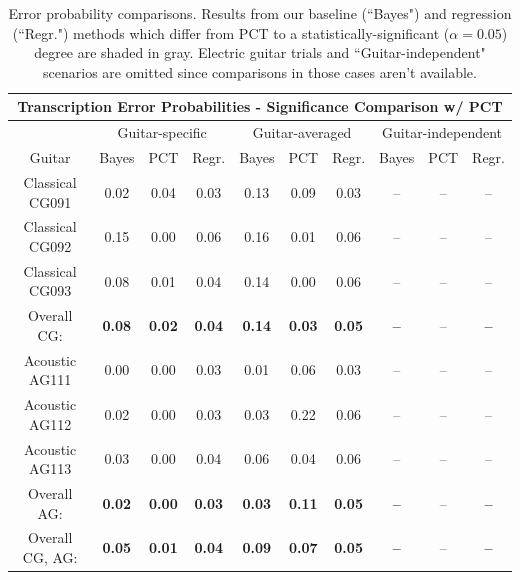 \documentclass[12pt]{cmuthesis}
\begin{document}
\begin{table}[!htbp]
\begin{center}
\begin{tabular} {||c||c|c|c||c|c|c||c|c|c||}
\hline
\multicolumn{10}{||c||}{\bf{Transcription Error Probabilities - Significance Comparison w/ PCT}} \\
\hline
 & \multicolumn{3}{|c||}{Guitar-specific} & \multicolumn{3}{|c||}{Guitar-averaged}& \multicolumn{3}{|c||}{Guitar-independent}\\
\hline
Guitar & Bayes & PCT & Regr. & Bayes & PCT & Regr. & Bayes & PCT & Regr.\\
\hline
\hline
Classical CG091 &  \cellcolor[gray]{0.8}0.02 & 0.04 & 0.03 &  \cellcolor[gray]{0.8}0.13 & 0.09 &  \cellcolor[gray]{0.8}0.03 & -- & -- & -- \\
\hline
Classical CG092 &  \cellcolor[gray]{0.8}0.15 & 0.00 &  \cellcolor[gray]{0.8}0.06 &  \cellcolor[gray]{0.8}0.16 & 0.01 &  \cellcolor[gray]{0.8}0.06 & -- & -- & -- \\
\hline
Classical CG093 &  \cellcolor[gray]{0.8}0.08 & 0.01 &  \cellcolor[gray]{0.8}0.04 & \cellcolor[gray]{0.8}0.14 & 0.00 &  \cellcolor[gray]{0.8}0.06 & -- & -- & -- \\
\hline
Overall CG: &  \cellcolor[gray]{0.8}\bf{0.08} & \bf{0.02}  &  \cellcolor[gray]{0.8}\bf{0.04} &  \cellcolor[gray]{0.8}\bf{0.14} & \bf{0.03} &  \cellcolor[gray]{0.8}\bf{0.05} & \bf{--} & -- & \bf{--}\\
\hline
\hline
Acoustic AG111 & 0.00 & 0.00 &  \cellcolor[gray]{0.8}0.03 &  \cellcolor[gray]{0.8}0.01 & 0.06 &  \cellcolor[gray]{0.8}0.03 & -- & -- & -- \\
\hline
Acoustic AG112 &  \cellcolor[gray]{0.8}0.02 & 0.00 &  \cellcolor[gray]{0.8}0.03 &  \cellcolor[gray]{0.8}0.03 & 0.22 &  \cellcolor[gray]{0.8}0.06 & -- & -- & -- \\
\hline
Acoustic AG113  &  \cellcolor[gray]{0.8}0.03 & 0.00 &  \cellcolor[gray]{0.8}0.04 &  \cellcolor[gray]{0.8}0.06 & 0.04 &  \cellcolor[gray]{0.8}0.06 & -- & -- & --\\
\hline
Overall AG: &  \cellcolor[gray]{0.8}\bf{0.02} & \bf{0.00} &  \cellcolor[gray]{0.8}\bf{0.03} &  \cellcolor[gray]{0.8}\bf{0.03} & \bf{0.11} &  \cellcolor[gray]{0.8}\bf{0.05} & \bf{--} & -- & \bf{--}\\
\hline
\hline
\hline
Overall CG, AG: &   \cellcolor[gray]{0.8}\bf{0.05} & \bf{0.01} &   \cellcolor[gray]{0.8}\bf{0.04} &  \cellcolor[gray]{0.8}\bf{0.09} & \bf{0.07} &  \cellcolor[gray]{0.8}\bf{0.05} & \bf{--} & -- & \bf{--}\\
\hline
\hline
\end{tabular}
\caption{Error probability comparisons. Results from our baseline (``Bayes") and regression (``Regr.") methods which differ from PCT to a statistically-significant ($\alpha=0.05$) degree are shaded in gray. Electric guitar trials and ``Guitar-independent" scenarios are omitted since comparisons in those cases aren't available.}
\label{tab:ttest-RWC}
\end{center}
\end{table}
\end{document}
